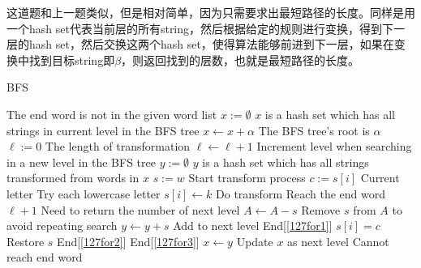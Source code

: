 这道题和上一题类似，但是相对简单，因为只需要求出最短路径的长度。同样是用一个hash set代表当前层的所有string，然后根据给定的规则进行变换，得到下一层的hash set，然后交换这两个hash set，使得算法能够前进到下一层，如果在变换中找到目标string即$\beta$，则返回找到的层数，也就是最短路径的长度。

\setcounter{algorithm}{0}
\begin{algorithm}[H]
\caption{BFS}
\begin{algorithmic}[1]
 \Comment The end word is not in the given word list
\State {}
\EndIf
\State $x:=\emptyset$ \Comment $x$ is a hash set which has all strings in current level in the BFS tree
\State $x\gets x+\alpha$ \Comment The BFS tree's root is $\alpha$
\State $\ell:=0$ \Comment The length of transformation
\State $\ell\gets \ell +1$ \Comment Increment level when searching in a new level in the BFS tree
\State $y:=\emptyset$ \Comment $y$ is a hash set which has all strings transformed from words in $x$
 \label{127for3}
\State $s:=w$
 \Comment Start transform process \label{127for2}
\State $c:=s[i]$ \Comment Current letter 
 \Comment Try each lowercase letter \label{127for1}
\State $s[i]\gets k$ \Comment Do transform
 \Comment Reach the end word
\State \Return $\ell +1$ \Comment Need to return the number of next level
\EndIf
\State $A\gets A- s$ \Comment Remove $s$ from $A$ to avoid repeating search
\State $y\gets y+s$ \Comment Add to next level
\EndFor \Comment End[\ref{127for1}]
\State $s[i] = c$ \Comment Restore $s$
\EndFor \Comment End[\ref{127for2}]
\EndFor \Comment End[\ref{127for3}]
\State $x\gets y$ \Comment Update $x$ as next level
\EndWhile
\State {} \Comment Cannot reach end word
\EndProcedure
\end{algorithmic}
\end{algorithm}